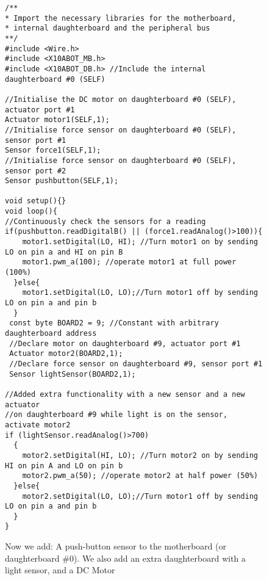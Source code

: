 \begin{figure}
		\footnotesize
    {\fontsize{8}{6}\selectfont
		\begin{verbatim}
        \end{verbatim}
        \begin{verbatim}
/**
* Import the necessary libraries for the motherboard, 
* internal daughterboard and the peripheral bus
**/
#include <Wire.h>  
#include <X10ABOT_MB.h>
#include <X10ABOT_DB.h> //Include the internal daughterboard #0 (SELF)

//Initialise the DC motor on daughterboard #0 (SELF), actuator port #1
Actuator motor1(SELF,1);
//Initialise force sensor on daughterboard #0 (SELF), sensor port #1
Sensor force1(SELF,1);
//Initialise force sensor on daughterboard #0 (SELF), sensor port #2
Sensor pushbutton(SELF,1);
   
void setup(){}
void loop(){
//Continuously check the sensors for a reading
if(pushbutton.readDigitalB() || (force1.readAnalog()>100)){
    motor1.setDigital(LO, HI); //Turn motor1 on by sending LO on pin a and HI on pin B
    motor1.pwm_a(100); //operate motor1 at full power (100%) 
  }else{
    motor1.setDigital(LO, LO);//Turn motor1 off by sending LO on pin a and pin b
  }
 const byte BOARD2 = 9; //Constant with arbitrary daughterboard address
 //Declare motor on daughterboard #9, actuator port #1
 Actuator motor2(BOARD2,1);
 //Declare force sensor on daughterboard #9, sensor port #1
 Sensor lightSensor(BOARD2,1);
 
//Added extra functionality with a new sensor and a new actuator
//on daughterboard #9 while light is on the sensor, activate motor2
if (lightSensor.readAnalog()>700)
  {
    motor2.setDigital(HI, LO); //Turn motor2 on by sending HI on pin A and LO on pin b
    motor2.pwm_a(50); //operate motor2 at half power (50%)
  }else{
    motor2.setDigital(LO, LO);//Turn motor1 off by sending LO on pin a and pin b
  }
}	 
	\end{verbatim}
  }
		\caption{Now we add: A push-button sensor to the motherboard (or daughterboard \#0). We also add an extra daughterboard with a light sensor, and a DC Motor} \label{code:simplplus}
    
\end{figure}

